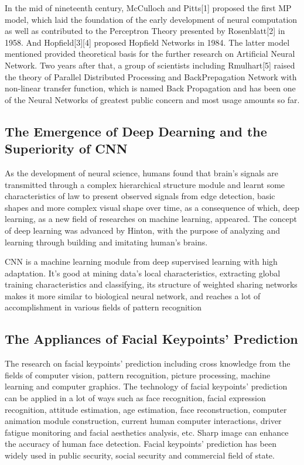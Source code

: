 \documentclass{article}
\begin{document}
In the mid of nineteenth century, McCulloch and Pitts[1] proposed the first MP model, which laid the foundation of the early development of neural computation as well as contributed to the Perceptron Theory presented by Rosenblatt[2] in 1958. And Hopfield[3][4] proposed Hopfield Networks in 1984. The latter model mentioned provided theoretical basis for the further research on Artificial Neural Network. Two years after that, a group of scientists including Rmulhart[5] raised the theory of Parallel Distributed Processing and BackPrepagation Network with non-linear transfer function, which is named Back Propagation and has been one of the Neural Networks of greatest public concern and most usage amounts so far.
	\subsection{The Emergence of Deep Dearning and the Superiority of CNN}
As the development of neural science, humans found that brain's signals are transmitted through a complex hierarchical structure module and learnt some characteristics of law to present observed signals from edge detection, basic shapes and more complex visual shape over time, as a consequence of which, deep learning, as a new field of researches on machine learning, appeared. The concept of deep learning was advanced by Hinton, with the purpose of analyzing and learning through building and imitating human's brains.

CNN is a machine learning module from deep supervised learning with high adaptation. It's good at mining data's local characteristics, extracting global training characteristics and classifying, its structure of weighted sharing networks makes it more similar to biological neural network, and reaches a lot of accomplishment in various fields of pattern recognition
	\subsection{The Appliances of Facial Keypoints' Prediction}
The research on facial keypoints' prediction including cross knowledge from the fields of computer vision, pattern recognition, picture processing, machine learning and computer graphics. The technology of facial keypoints' prediction can be applied in a lot of ways such as face recognition, facial expression recognition, attitude estimation, age estimation, face reconstruction, computer animation module construction, current human computer interactions, driver fatigue monitoring and facial aesthetics analysis, etc. Sharp image can enhance the accuracy of human face detection. Facial keypoints' prediction has been widely used in public security, social security and commercial field of state.
\end{document}
